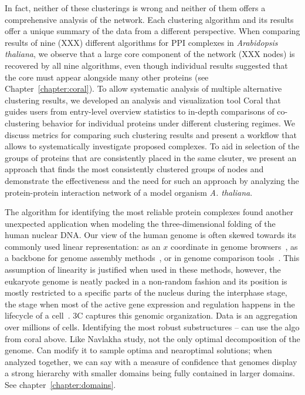 In fact, neither of these clusterings is wrong and neither of them offers a comprehensive analysis of the network. Each clustering algorithm and its results offer a unique summary of the data from a different perspective. When comparing results of nine (XXX) different algorithms for PPI complexes in \textit{Arabidopsis thaliana}, we observe that a large core component of the network (XXX nodes) is recovered by all nine algorithms, even though individual results suggested that the core must appear alongside many other proteins (see Chapter~\ref{chapter:coral}). To allow systematic analysis of multiple alternative clustering results, we developed an analysis and visualization tool Coral that guides users from entry-level overview statistics to in-depth comparisons of co-clustering behavior for individual proteins under different clustering regimes. We discuss metrics for comparing such clustering results and present a workflow that allows to systematically investigate proposed complexes. To aid in selection of the groups of proteins that are consistently placed in the same clsuter, we present an approach that finds the most consistently clustered groups of nodes and demonstrate the effectiveness and the need for such an approach by analyzing the protein-protein interaction network of a model organism \textit{A. thaliana}.



The algorithm for identifying the most reliable protein complexes found another unexpected application when modeling the three-dimensional folding of the human nuclear DNA. Our view of the human genome is often skewed towards its commonly used linear representation: as an $x$ coordinate in genome browsers~\cite{GenomeBrowser}, as a backbone for genome assembly methods~\cite{RandomGenomeAssemblyMethod}, or in genome comparison tools~\cite{DotPlot}. This assumption of linearity is justified when used in these methods, however, the eukaryote genome is neatly packed in a non-random fashion and its position is mostly restricted to a specific parts of the nucleus during the interphase stage, the stage when most of the active gene expression and regulation happens in the lifecycle of a cell~\cite{GenomeOrganizationReview}. 
3C captures this genomic organization.
Data is an aggregation over millions of cells.
Identifying the most robust substructures -- can use the algo from coral above.
Like Navlakha study, not the only optimal decomposition of the genome. Can modify it to sample optima and nearoptimal solutions; when analyzed together, we can say with a measure of confidence that genomes display a strong hierarchy with smaller domains being fully contained in larger domains. See chapter~\ref{chapter:domains}.

